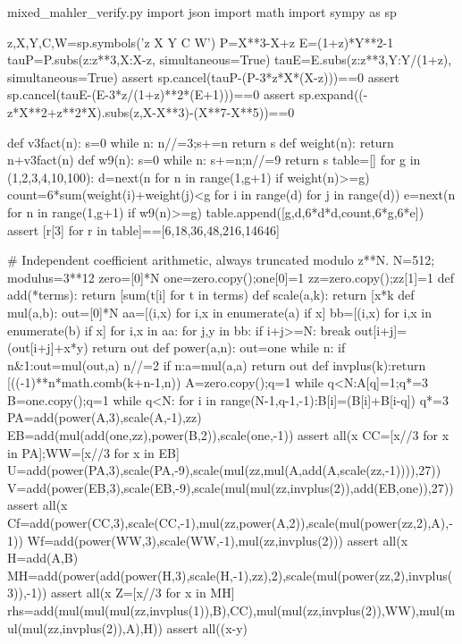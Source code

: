 \begin{filecontents*}[overwrite]{mixed_mahler_verify.py}
import json
import math
import sympy as sp

z,X,Y,C,W=sp.symbols('z X Y C W')
P=X**3-X+z
E=(1+z)*Y**2-1
tauP=P.subs({z:z**3,X:X-z}, simultaneous=True)
tauE=E.subs({z:z**3,Y:Y/(1+z)}, simultaneous=True)
assert sp.cancel(tauP-(P-3*z*X*(X-z)))==0
assert sp.cancel(tauE-(E-3*z/(1+z)**2*(E+1)))==0
assert sp.expand((-z*X**2+z**2*X).subs(z,X-X**3)-(X**7-X**5))==0

def v3fact(n):
    s=0
    while n:
        n//=3;s+=n
    return s
def weight(n): return n+v3fact(n)
def w9(n):
    s=0
    while n:
        s+=n;n//=9
    return s
table=[]
for g in (1,2,3,4,10,100):
    d=next(n for n in range(1,g+1) if weight(n)>=g)
    count=6*sum(weight(i)+weight(j)<g for i in range(d) for j in range(d))
    e=next(n for n in range(1,g+1) if w9(n)>=g)
    table.append([g,d,6*d*d,count,6*g,6*e])
assert [r[3] for r in table]==[6,18,36,48,216,14646]

# Independent coefficient arithmetic, always truncated modulo z**N.
N=512; modulus=3**12
zero=[0]*N
one=zero.copy();one[0]=1
zz=zero.copy();zz[1]=1
def add(*terms): return [sum(t[i] for t in terms)%
def scale(a,k): return [x*k%
def mul(a,b):
    out=[0]*N
    aa=[(i,x) for i,x in enumerate(a) if x]
    bb=[(i,x) for i,x in enumerate(b) if x]
    for i,x in aa:
        for j,y in bb:
            if i+j>=N: break
            out[i+j]=(out[i+j]+x*y)%
    return out
def power(a,n):
    out=one
    while n:
        if n&1:out=mul(out,a)
        n//=2
        if n:a=mul(a,a)
    return out
def invplus(k):return [((-1)**n*math.comb(k+n-1,n))%
A=zero.copy();q=1
while q<N:A[q]=1;q*=3
B=one.copy();q=1
while q<N:
    for i in range(N-1,q-1,-1):B[i]=(B[i]+B[i-q])%
    q*=3
PA=add(power(A,3),scale(A,-1),zz)
EB=add(mul(add(one,zz),power(B,2)),scale(one,-1))
assert all(x%
CC=[x//3 for x in PA];WW=[x//3 for x in EB]
U=add(power(PA,3),scale(PA,-9),scale(mul(zz,mul(A,add(A,scale(zz,-1)))),27))
V=add(power(EB,3),scale(EB,-9),scale(mul(mul(zz,invplus(2)),add(EB,one)),27))
assert all(x%
Cf=add(power(CC,3),scale(CC,-1),mul(zz,power(A,2)),scale(mul(power(zz,2),A),-1))
Wf=add(power(WW,3),scale(WW,-1),mul(zz,invplus(2)))
assert all(x%
H=add(A,B)
MH=add(power(add(power(H,3),scale(H,-1),zz),2),scale(mul(power(zz,2),invplus(3)),-1))
assert all(x%
Z=[x//3 for x in MH]
rhs=add(mul(mul(mul(zz,invplus(1)),B),CC),mul(mul(zz,invplus(2)),WW),mul(mul(mul(zz,invplus(2)),A),H))
assert all((x-y)%


\end{filecontents*}

